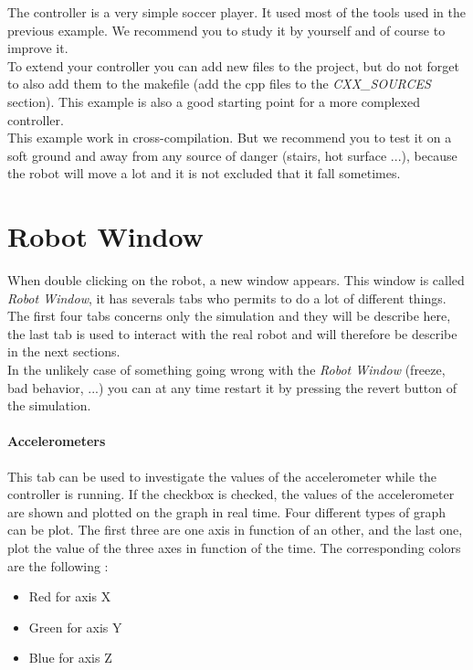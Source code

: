 \documentclass[a4paper, 12pt]{article}  		%
\begin{document}
The controller is a very simple soccer player. It used most of the tools used in the previous example. We recommend you to study it by yourself and of course to improve it.\\

To extend your controller you can add new files to the project, but do not forget to also add them to the makefile (add the cpp files to the \textit{CXX\_SOURCES} section). This example is also a good starting point for a more complexed controller.\\

This example work in cross-compilation. But we recommend you to test it on a soft ground and away from any source of danger (stairs, hot surface ...), because the robot will move a lot and it is not excluded that it fall sometimes.\\



\newpage
\section{Robot Window}

When double clicking on the robot, a new window appears. This window is called \textit{Robot Window}, it has severals tabs who permits to do a lot of different things. The first four tabs concerns only the simulation and they will be describe here, the last tab is used to interact with the real robot and will therefore be describe in the next sections.\\

In the unlikely case of something going wrong with the \textit{Robot Window} (freeze, bad behavior, ...) you can at any time restart it by pressing the revert button of the simulation.\\

\paragraph*{Accelerometers} 
This tab can be used to investigate the values of the accelerometer while the controller is running. If the checkbox is checked, the values of the accelerometer are shown and plotted on the graph in real time. Four different types of graph can be plot. The first three are one axis in function of an other, and the last one, plot the value of the three axes in function of the time. The corresponding colors are the following :\\
\begin{itemize}
\item Red for axis X
\item Green for axis Y
\item Blue for axis Z
\end{itemize}
\end{document}
